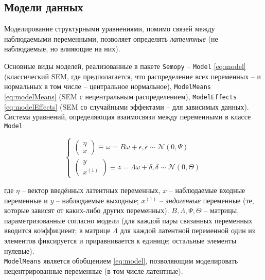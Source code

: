 \subsection{Модели данных}

Моделирование структурными уравнениями, помимо связей между наблюдаемыми переменными, позволяет определять \emph{латентные} (не наблюдаемые, но влияющие на них).

Основные виды моделей, реализованные в пакете \texttt{Semopy} -- \texttt{Model} \eqref{eq:model}  (классический SEM, где предполагается, что распределение всех переменных -- и нормальных в том числе -- центральное нормальное), \texttt{ModelMeans} \eqref{eq:modelMeans} (SEM с нецентральным распределением), \texttt{ModelEffects} \eqref{eq:modelEffects} (SEM со случайными эффектами -- для зависимых данных). \\

Система уравнений, определяющая взаимосвязи между переменными в классе \texttt{Model}

\begin{equation}\label{eq:model}
	\begin{cases}
		\begin{pmatrix}
			\eta \\ x
		\end{pmatrix} \equiv \omega = B \omega + \epsilon, \epsilon \sim \mathcal{N}(0, \Psi) \\
		\begin{pmatrix}
			y \\ x^{(1)}
		\end{pmatrix} \equiv z = \Lambda \omega + \delta, \delta \sim \mathcal{N}(0, \Theta)
	\end{cases}
\end{equation}

где $ \eta $ -- вектор введённых латентных переменных, $ x $ -- наблюдаемые входные переменные и $ y $ -- наблюдаемые выходные; $ x^{(1)} $ -- \emph{эндогенные} переменные (те, которые зависят от каких-либо других переменных).
$ B, \Lambda, \Psi, \Theta $ -- матрицы, параметризованные согласно модели (для каждой пары связанных переменных вводится коэффициент; в матрице $ \Lambda $ для каждой латентной переменной один из элементов фиксируется и приравнивается к единице; остальные элементы нулевые). \\

\texttt{ModelMeans} является обобщением \eqref{eq:model}, позволяющим моделировать нецентрированные переменные (в том числе латентные).

